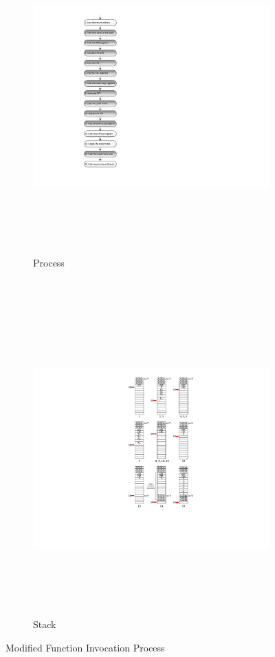 \begin{figure}[h]
        \centering
        \begin{subfigure}[b]{0.4\columnwidth}
                \includegraphics[width=\textwidth, height=12cm]{figures/modified_function_operations_process_pre_execution_v2}
                \caption{Process}
                \label{fig:modified_function_operation_process_pre_execution}
        \end{subfigure}~
        \begin{subfigure}[b]{0.6\columnwidth}
                \includegraphics[width=\textwidth, height=12cm]{figures/modified_function_operations_stack_pre_execution_v2}
                \caption{Stack}
                \label{fig:modified_function_operation_stack_pre_execution}
        \end{subfigure}
        \caption{Modified Function Invocation Process}\label{fig:modified_function_operation_pre_execution}
        \vspace{-10pt}
\end{figure}
\vspace{-15pt}
